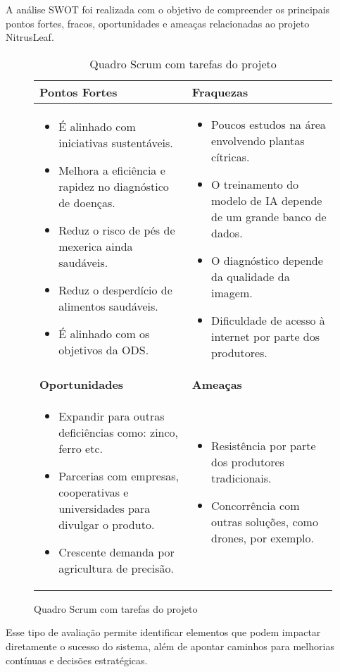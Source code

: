 A análise SWOT foi realizada com o objetivo de compreender os principais
pontos fortes, fracos, oportunidades e ameaças relacionadas ao projeto NitrusLeaf.

\begin{figure}[H]
\begin{table}[h]
\centering
\caption{Quadro Scrum com tarefas do projeto}
\renewcommand{\arraystretch}{1.2}
\begin{tabularx}{\textwidth}{|>{\raggedright\arraybackslash}X|>{\raggedright\arraybackslash}X|}
\hline
\textbf{Pontos Fortes} & \textbf{Fraquezas} \\
\hline
\begin{itemize}[left=0pt]
  \item É alinhado com iniciativas sustentáveis.
  \item Melhora a eficiência e rapidez no diagnóstico de doenças.
  \item Reduz o risco de pés de mexerica ainda saudáveis.
  \item Reduz o desperdício de alimentos saudáveis.
  \item É alinhado com os objetivos da ODS.
\end{itemize}
&
\begin{itemize}[left=0pt]
  \item Poucos estudos na área envolvendo plantas cítricas.
  \item O treinamento do modelo de IA depende de um grande banco de dados.
  \item O diagnóstico depende da qualidade da imagem.
  \item Dificuldade de acesso à internet por parte dos produtores.
\end{itemize}
\\
\hline
\textbf{Oportunidades} & \textbf{Ameaças} \\
\hline
\begin{itemize}[left=0pt]
  \item Expandir para outras deficiências como: zinco, ferro etc.
  \item Parcerias com empresas, cooperativas e universidades para divulgar o produto.
  \item Crescente demanda por agricultura de precisão.
\end{itemize}
&
\begin{itemize}[left=0pt]
  \item Resistência por parte dos produtores tradicionais.
  \item Concorrência com outras soluções, como drones, por exemplo.
\end{itemize}
\\
\hline
\end{tabularx}
\end{table}
\end{figure}
\medskip

Esse tipo de avaliação permite identificar elementos que podem impactar
diretamente o sucesso do sistema, além de apontar caminhos para melhorias contínuas
e decisões estratégicas.